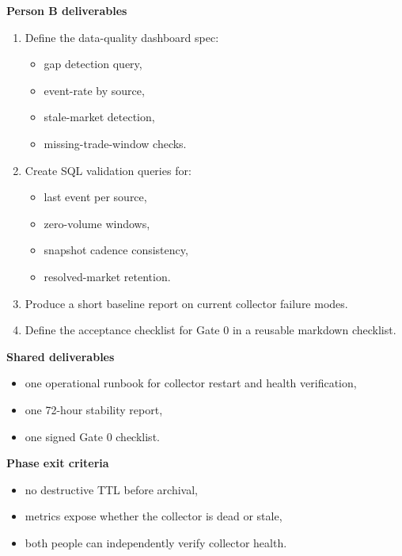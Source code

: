 \documentclass[
]{article}
\providecommand{\tightlist}{%
  \setlength{\itemsep}{0pt}\setlength{\parskip}{0pt}}
\begin{document}
\textbf{Person B deliverables}

\begin{enumerate}
\def\labelenumi{\arabic{enumi}.}
\tightlist
\item
  Define the data-quality dashboard spec:

  \begin{itemize}
  \tightlist
  \item
    gap detection query,
  \item
    event-rate by source,
  \item
    stale-market detection,
  \item
    missing-trade-window checks.
  \end{itemize}
\item
  Create SQL validation queries for:

  \begin{itemize}
  \tightlist
  \item
    last event per source,
  \item
    zero-volume windows,
  \item
    snapshot cadence consistency,
  \item
    resolved-market retention.
  \end{itemize}
\item
  Produce a short baseline report on current collector failure modes.
\item
  Define the acceptance checklist for Gate 0 in a reusable markdown
  checklist.
\end{enumerate}

\textbf{Shared deliverables}

\begin{itemize}
\tightlist
\item
  one operational runbook for collector restart and health verification,
\item
  one 72-hour stability report,
\item
  one signed Gate 0 checklist.
\end{itemize}

\textbf{Phase exit criteria}

\begin{itemize}
\tightlist
\item
  no destructive TTL before archival,
\item
  metrics expose whether the collector is dead or stale,
\item
  both people can independently verify collector health.
\end{itemize}
\end{document}
